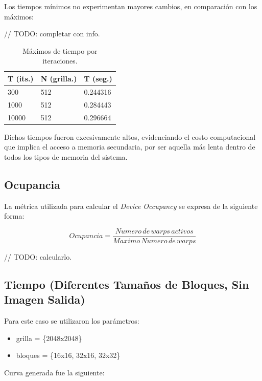 \documentclass[jou]{apa6}
\begin{document}
Los tiempos mínimos no experimentan mayores cambios, en comparación con los máximos:

// TODO: completar con info.
\begin{table}[h]
	\centering
	\caption{Máximos de tiempo por iteraciones.}
	\label{my-label}
	\begin{tabular}{@{}lll@{}}
		\toprule
		\multicolumn{1}{c}{T (its.)} & \multicolumn{1}{c}{N (grilla.)} & \multicolumn{1}{c}{T (seg.)} \\ \midrule
		300                          & 512                          & 0.244316                     \\
		1000                         & 512                          & 0.284443                     \\
		10000                        & 512                          & 0.296664                     \\ \bottomrule
	\end{tabular}
\end{table}

Dichos tiempos fueron excesivamente altos, evidenciando el costo computacional que implica el acceso a memoria secundaria, por ser aquella más lenta dentro de todos los tipos de memoria del sistema.

\FloatBarrier

\subsection{Ocupancia}
La métrica utilizada para calcular el \textit{Device Occupancy} se expresa de la siguiente forma:

\[
	Ocupancia = \frac{Numero\, de\, warps\, activos}{Maximo\, Numero\, de\, warps}
\]

// TODO: calcularlo.

\subsection{Tiempo (Diferentes Tamaños de Bloques, Sin Imagen Salida)}
Para este caso se utilizaron los parámetros:

\begin{itemize}
	\item grilla = \{2048x2048\}
	\item bloques = \{16x16, 32x16, 32x32\}
\end{itemize}

Curva generada fue la siguiente:
\end{document}
